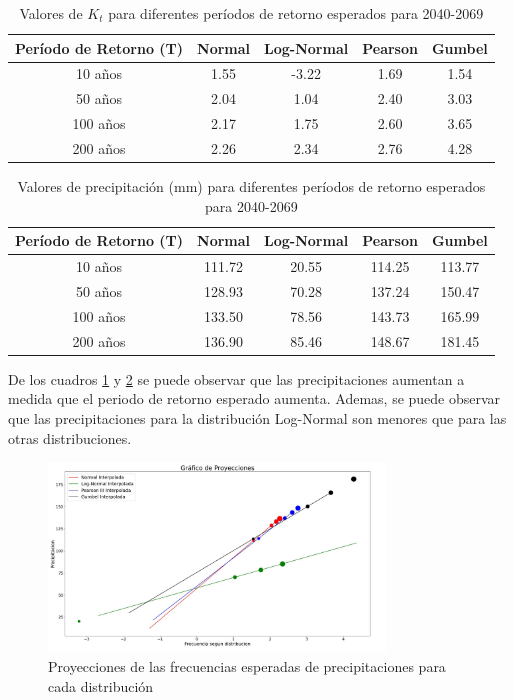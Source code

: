 \documentclass{article}  %
\begin{document}
\begin{table}[H]
  \centering
  \caption{Valores de \( K_t \) para diferentes períodos de retorno esperados para 2040-2069}
  \vspace{0.2cm}
  \begin{tabular}{|c|c|c|c|c|}
  \hline
  \textbf{Período de Retorno (T)} & \textbf{Normal} & \textbf{Log-Normal} & \textbf{Pearson} & \textbf{Gumbel} \\ \hline
  10 años  & 1.55 & -3.22 & 1.69 & 1.54 \\ \hline
  50 años  & 2.04 & 1.04  & 2.40 & 3.03 \\ \hline
  100 años & 2.17 & 1.75  & 2.60 & 3.65 \\ \hline
  200 años & 2.26 & 2.34  & 2.76 & 4.28 \\ \hline
  \end{tabular}
  \label{table:kt_b}
\end{table}

\begin{table}[H]
  \centering
  \caption{Valores de precipitación (mm) para diferentes períodos de retorno esperados para 2040-2069}
  \vspace{0.2cm}
  \begin{tabular}{|c|c|c|c|c|}
  \hline
  \textbf{Período de Retorno (T)} & \textbf{Normal} & \textbf{Log-Normal} & \textbf{Pearson} & \textbf{Gumbel} \\ \hline
  10 años  & 111.72 & 20.55 & 114.25 & 113.77 \\ \hline
  50 años  & 128.93 & 70.28 & 137.24 & 150.47 \\ \hline
  100 años & 133.50 & 78.56 & 143.73 & 165.99 \\ \hline
  200 años & 136.90 & 85.46 & 148.67 & 181.45 \\ \hline
  \end{tabular}
  \label{table:precipitacion_b}
\end{table}

De los cuadros \ref{table:kt_b} y \ref{table:precipitacion_b} se puede observar que las precipitaciones aumentan a medida que el periodo de retorno esperado aumenta. Ademas, se puede observar que las precipitaciones para la distribución Log-Normal son menores que para las otras distribuciones.

\begin{figure}[H]
  \centering
  \includegraphics[width=0.8\textwidth]{grafico_b_proyecciones.jpg}
  \caption{Proyecciones de las frecuencias esperadas de precipitaciones para cada distribución}
  \label{fig:grafico_b_preyecciones}
\end{figure}
\end{document}
